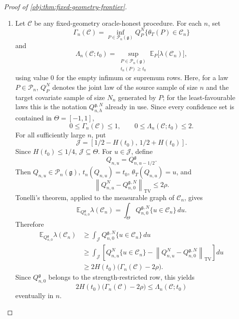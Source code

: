 \begin{proof}[Proof of \cref{obj:thm:fixed-geometry-frontier}]
\begin{enumerate}
\item Let \(\mathscr C\) be any fixed-geometry oracle-honest procedure.  For each \(n\), set
\[
\Gamma_n(\mathscr C)
=
\inf_{P\in\mathcal P_n(\mathfrak g)}
Q_P^N\{\theta_T(P)\in \mathscr C_n\}
\]
and
\[
\Lambda_n(\mathscr C;t_0)
=
\sup_{\substack{P\in\mathcal P_n(\mathfrak g)\\ t_n(P)\ge t_0}}
\mathbb E_P\bigl[\lambda(\mathscr C_n)\bigr],
\]
using value \(0\) for the empty infimum or supremum rows.  Here, for a law \(P\in\mathcal P_n\), \(Q_P^{N}\) denotes the joint law of the source sample of size \(n\) and the target covariate sample of size \(N_n\) generated by \(P\); for the least-favourable laws this is the notation \(Q_{n,h}^{\mathfrak g,N}\) already in use.  Since every confidence set is contained in \(\Theta=[-1,1]\),
\[
0\le \Gamma_n(\mathscr C)\le 1,
\qquad
0\le \Lambda_n(\mathscr C;t_0)\le 2 .
\]
For all sufficiently large \(n\), put
\[
\mathcal J=[1/2-H(t_0),\,1/2+H(t_0)].
\]
Since \(H(t_0)\le1/4\), \(\mathcal J\subseteq\Theta\).  For \(u\in\mathcal J\), define
\[
Q_{n,u}=Q_{n,u-1/2}^{\mathfrak g}.
\]
Then \(Q_{n,u}\in\mathcal P_n(\mathfrak g)\), \(t_n(Q_{n,u})=t_0\), \(\theta_T(Q_{n,u})=u\), and
\[
\left\|Q_{n,u}^{N}-Q_{n,0}^{\mathfrak g,N}\right\|_{\mathrm{TV}}\le 2\rho .
\]
Tonelli's theorem, applied to the measurable graph of \(\mathscr C_n\), gives
\[
\mathbb E_{Q_{n,0}^{\mathfrak g}}\lambda(\mathscr C_n)
=
\int_{\Theta}
Q_{n,0}^{\mathfrak g,N}\{u\in\mathscr C_n\}\,du .
\]
Therefore
\[
\begin{aligned}
\mathbb E_{Q_{n,0}^{\mathfrak g}}\lambda(\mathscr C_n)
&\ge
\int_{\mathcal J}
Q_{n,0}^{\mathfrak g,N}\{u\in\mathscr C_n\}\,du\\
&\ge
\int_{\mathcal J}
\left[
Q_{n,u}^{N}\{u\in\mathscr C_n\}
-
\left\|Q_{n,u}^{N}-Q_{n,0}^{\mathfrak g,N}\right\|_{\mathrm{TV}}
\right]du\\
&\ge
2H(t_0)\bigl(\Gamma_n(\mathscr C)-2\rho\bigr).
\end{aligned}
\]
Since \(Q_{n,0}^{\mathfrak g}\) belongs to the strength-restricted row, this yields
\[
2H(t_0)\bigl(\Gamma_n(\mathscr C)-2\rho\bigr)
\le
\Lambda_n(\mathscr C;t_0)
\]
eventually in \(n\).


\end{enumerate}
\end{proof}
